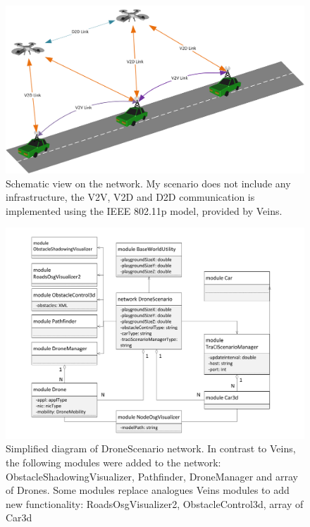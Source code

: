 \documentclass[]{nsm-thesis}
\begin{document}
\begin{figure}
	\centering
	\includegraphics[width=1\textwidth]{figures/DAVNScheme.png}
	\caption{Schematic view on the network. My scenario does not include any infrastructure, the \ac{V2V}, \ac{V2D} and \ac{D2D} communication is implemented using the IEEE 802.11p model, provided by Veins.}
	\label{fig:vanetscheme}
\end{figure}

\begin{figure}
	\centering
	\includegraphics[width=1\textwidth]{figures/DroneScenario.pdf}
	\caption{Simplified diagram of DroneScenario network. In contrast to Veins, the following modules were added to the network: ObstacleShadowingVisualizer, Pathfinder, DroneManager and array of Drones. Some modules replace analogues Veins modules to add new functionality: RoadsOsgVisualizer2, ObstacleControl3d, array of Car3d}
	\label{fig:dronescenarioned}
\end{figure}
\end{document}
